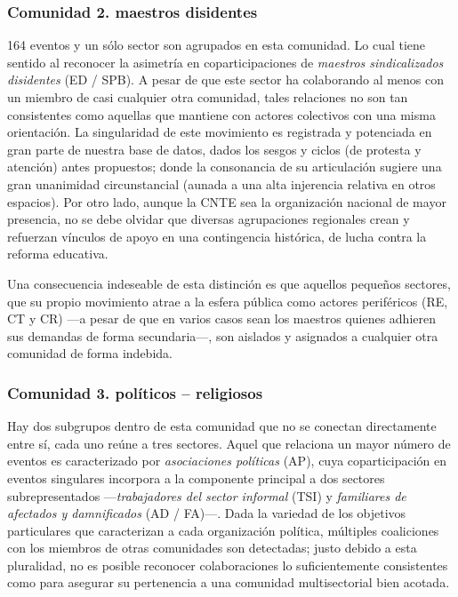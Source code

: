\documentclass[letterpaper, 11pt]{book}
\theoremstyle{definition}
\theoremstyle{remark}
\begin{document}
\subsubsection{Comunidad 2. maestros disidentes}
\label{subsubsec:comunidad2}

164 eventos y un sólo sector son agrupados en esta comunidad. 
Lo cual tiene sentido al reconocer la asimetría en coparticipaciones de \emph{maestros sindicalizados disidentes} (ED / SPB). 
A pesar de que este sector ha colaborando al menos con un miembro de casi cualquier otra comunidad, tales relaciones no son tan consistentes como aquellas que mantiene con actores colectivos con una misma orientación. 
La singularidad de este movimiento es registrada y potenciada en gran parte de nuestra base de datos, dados los sesgos y ciclos (de protesta y atención) antes propuestos; donde la consonancia de su articulación sugiere una gran unanimidad circunstancial (aunada a una alta injerencia relativa en otros espacios). 
Por otro lado, aunque la CNTE sea la organización nacional de mayor presencia, no se debe olvidar que diversas agrupaciones regionales crean y refuerzan vínculos de apoyo en una contingencia histórica, de lucha contra la reforma educativa. 


Una consecuencia indeseable de esta distinción es que aquellos pequeños sectores, que su propio movimiento atrae a la esfera pública como actores periféricos (RE, CT y CR) ---a pesar de que en varios casos sean los maestros quienes adhieren sus demandas de forma secundaria---, son aislados y asignados a cualquier otra comunidad de forma indebida. 



\subsubsection{Comunidad 3. políticos -- religiosos}
\label{subsubsec:comunidad3}

Hay dos subgrupos dentro de esta comunidad que no se conectan directamente entre sí, cada uno reúne a tres sectores. 
Aquel que relaciona un mayor número de eventos es caracterizado por \emph{asociaciones políticas} (AP), cuya coparticipación en eventos singulares incorpora a la componente principal a dos sectores subrepresentados ---\emph{trabajadores del sector informal} (TSI) y \emph{familiares de afectados y damnificados} (AD / FA)---. 
Dada la variedad de los objetivos particulares que caracterizan a cada organización política, múltiples coaliciones con los miembros de otras comunidades son detectadas; justo debido a esta pluralidad, no es posible reconocer colaboraciones lo suficientemente consistentes como para asegurar su pertenencia a una comunidad multisectorial bien acotada. 
\end{document}
